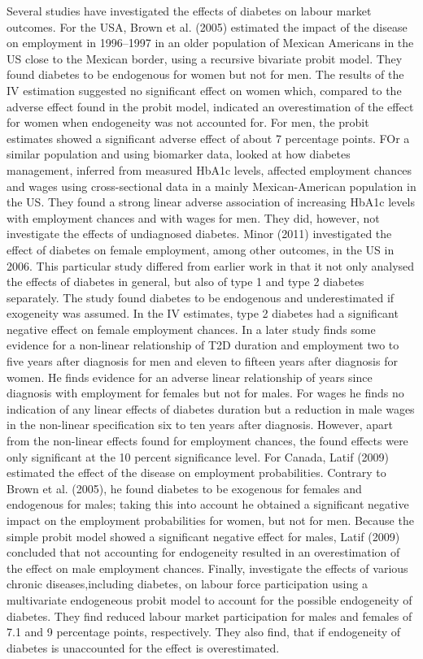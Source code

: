 Several studies have investigated the effects of diabetes on labour market outcomes. For the USA, Brown et al. (2005) estimated the impact of the disease on employment in 1996--1997 in an older population of Mexican Americans in the \ac{US} close to the Mexican border, using a recursive bivariate probit model. They found diabetes to be endogenous for women but not for men. The results of the \ac{IV} estimation suggested no significant effect on women which, compared to the adverse effect found in the probit model, indicated an overestimation of the effect for women when endogeneity was not accounted for. For men, the probit estimates showed a significant adverse effect of about 7 percentage points. FOr a similar population and using biomarker data,\citet{BrownIII2011} looked
at how diabetes management, inferred from measured \ac{HbA1c} levels,
affected employment chances and wages using cross-sectional data in
a mainly Mexican-American population in the US. They found a strong
linear adverse association of increasing \ac{HbA1c} levels with
employment chances and with wages for men. They did, however, not investigate the effects of undiagnosed diabetes. Minor (2011) investigated the effect of diabetes on female employment, among other outcomes, in the \ac{US} in 2006. This particular study differed from earlier work in that it not only analysed the effects of diabetes in general, but also of type 1 and type 2 diabetes separately. The study found diabetes to be endogenous and underestimated if exogeneity was assumed. In the \ac{IV} estimates, type 2 diabetes had a significant negative effect on female employment chances. In a later study \citet{Minor2013}
finds some evidence for a non-linear relationship of \ac{T2D} duration
and employment two to five years after diagnosis for men and eleven
to fifteen years after diagnosis for women. He finds evidence for
an adverse linear relationship of years since diagnosis with employment
for females but not for males. For wages he finds no indication of
any linear effects of diabetes duration but a reduction in male wages
in the non-linear specification six to ten years after diagnosis.
However, apart from the non-linear effects found for employment chances,
the found effects were only significant at the 10 percent significance
level. For Canada, Latif (2009) estimated the effect of the disease on employment probabilities. Contrary to Brown et al. (2005), he found diabetes to be exogenous for females and endogenous for males; taking this into account he obtained a significant negative impact on the employment probabilities for women, but not for men. Because the simple probit model showed a significant negative effect for males, Latif (2009) concluded that not accounting for 
endogeneity resulted in an overestimation of the effect on male employment chances. Finally, \cite{Zhang_2009} investigate the effects of various chronic diseases,including diabetes, on labour force participation using a multivariate endogeneous probit model to account for the possible endogeneity of diabetes. They find reduced labour market participation for males and females of 7.1 and 9 percentage points, respectively. They also find, that if endogeneity of diabetes is unaccounted for the effect is overestimated. 

